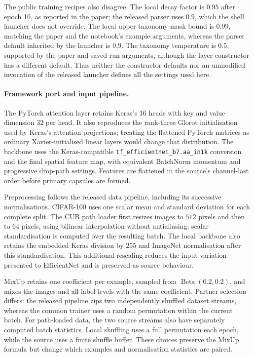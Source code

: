 The public training recipes also disagree. The local decay factor is $0.95$
after epoch 10, as reported in the paper; the released parser uses $0.9$, which
the shell launcher does not override. The local upper taxonomy-mask bound is
$0.99$, matching the paper and the notebook's example arguments, whereas the
parser default inherited by the launcher is $0.9$. The taxonomy temperature
is $0.5$, supported by the paper and saved run arguments, although the layer
constructor has a different default. Thus neither the constructor defaults nor
an unmodified invocation of the released launcher defines all the settings
used here.

\paragraph{Framework port and input pipeline.}
The PyTorch attention layer retains Keras's $16$ heads with key and value
dimension $32$ per head. It also reproduces the rank-three Glorot
initialisation used by Keras's attention projections; treating the flattened
PyTorch matrices as ordinary Xavier-initialised linear layers would change
that distribution. The backbone uses the Keras-compatible
\texttt{tf\_efficientnet\_b7.aa\_in1k} conversion and the final spatial feature
map, with equivalent BatchNorm momentum and progressive drop-path settings.
Features are flattened in the source's channel-last order before primary
capsules are formed.

Preprocessing follows the released data pipeline, including its successive
normalisations. CIFAR-100 uses one scalar mean and standard deviation for each
complete split. The CUB path loader first resizes images to $512$ pixels and
then to $64$ pixels, using bilinear interpolation without antialiasing; scalar
standardisation is computed over the resulting batch. The local backbone
also retains the embedded Keras division by $255$ and ImageNet normalisation
after this standardisation. This additional rescaling reduces the input
variation presented to EfficientNet and is preserved as source behaviour.

MixUp retains one coefficient per example, sampled from
$\operatorname{Beta}(0.2,0.2)$, and mixes the images and all label levels with
the same coefficient. Partner selection differs: the released pipeline zips
two independently shuffled dataset streams, whereas the common trainer uses a
random permutation within the current batch. For path-loaded data, the two
source streams also have separately computed batch statistics. Local shuffling
uses a full permutation each epoch, while the source uses a finite shuffle
buffer. These choices preserve the MixUp formula but change which examples and
normalisation statistics are paired.

